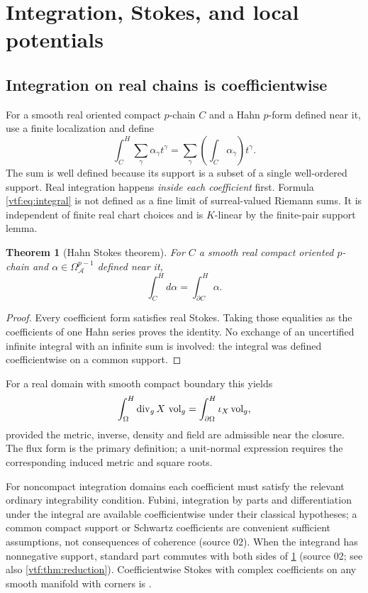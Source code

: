 \documentclass[11pt,letterpaper]{article}
\newtheorem{theorem}{Theorem}[section]
\theoremstyle{definition}
\theoremstyle{remark}
\newcommand{\A}{\mathscr A}\newcommand{\OO}{\mathcal O}\newcommand{\mm}{\mathfrak m}
\newcommand{\vol}{\operatorname{vol}}\newcommand{\GL}{\operatorname{GL}}
\begin{document}
\section{Integration, Stokes, and local potentials}\label{vtf:sec:integration}

\subsection{Integration on real chains is coefficientwise}

For a smooth real oriented compact $p$-chain $C$ and a Hahn $p$-form defined
near it, use a finite localization and define
\begin{equation}\label{vtf:eq:integral}
 \int_C^{H}\sum_\gamma\alpha_\gamma t^\gamma
 =\sum_\gamma\left(\int_C\alpha_\gamma\right)t^\gamma.
\end{equation}
The sum is well defined because its support is a subset of a single
well-ordered support. Real integration happens \emph{inside each coefficient}
first. Formula \eqref{vtf:eq:integral} is not defined as a fine limit of
surreal-valued Riemann sums. It is independent of finite real chart choices
and is $K$-linear by the finite-pair support lemma.

\begin{theorem}[Hahn Stokes theorem]\label{vtf:thm:stokes}
For $C$ a smooth real compact oriented $p$-chain and
$\alpha\in\Omega^{p-1}_\A$ defined near it,
\[
 \int_C^{H}d\alpha=\int_{\partial C}^{H}\alpha.
\]
\end{theorem}
\begin{proof}
Every coefficient form satisfies real Stokes. Taking those equalities as the
coefficients of one Hahn series proves the identity. No exchange of an
uncertified infinite integral with an infinite sum is involved: the integral
was defined coefficientwise on a common support.
\end{proof}

For a real domain with smooth compact boundary this yields
\[
 \int_\Omega^{H}\Div_gX\,\vol_g
 =\int_{\partial\Omega}^{H}\iota_X\vol_g,
\]
provided the metric, inverse, density and field are admissible near the
closure. The flux form is the primary definition; a unit-normal expression
requires the corresponding induced metric and square roots.

For noncompact integration domains each coefficient must satisfy the relevant
ordinary integrability condition. Fubini, integration by parts and
differentiation under the integral are available coefficientwise under their
classical hypotheses; a common compact support or Schwartz coefficients are
convenient sufficient assumptions, not consequences of coherence (source 02).
When the integrand has nonnegative support, standard part commutes with both
sides of \cref{vtf:thm:stokes} (source 02; see also \cref{vtf:thm:reduction}).
Coefficientwise Stokes with complex coefficients on any smooth manifold with
corners is .
\end{document}

